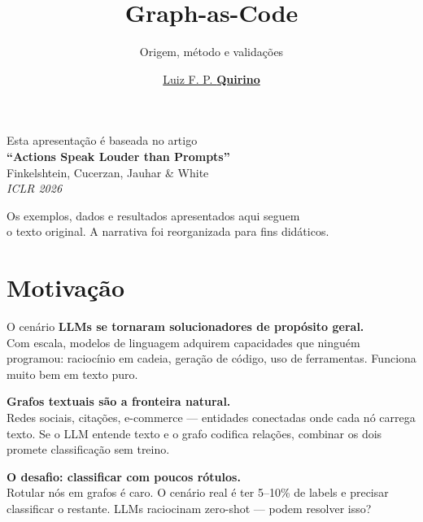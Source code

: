\documentclass{beamer}
\title{Graph-as-Code}
\subtitle{Origem, método e validações}
\author{\href{mailto:luiz.quirino@ufms.br}{Luiz F. P. \textbf{Quirino}}}
\begin{document}
\maketitle

\begin{frame}{}
  \vspace{2em}
  \begin{center}
    \large
    Esta apresentação é baseada no artigo\\[0.5em]
    \textbf{``Actions Speak Louder than Prompts''}\\[0.3em]
    \normalsize
    Finkelshtein, Cucerzan, Jauhar \& White\\[0.3em]
    \emph{ICLR 2026}
  \end{center}

  \vspace{1.5em}
  \begin{center}
    \normalsize
    Os exemplos, dados e resultados apresentados aqui seguem\\
    o texto original. A narrativa foi reorganizada para fins didáticos.
  \end{center}
\end{frame}


\section{Motivação}
\begin{frame}{O cenário}
  \textbf{LLMs se tornaram solucionadores de propósito geral.}\\
  {\small Com escala, modelos de linguagem adquirem capacidades que ninguém programou: raciocínio em cadeia, geração de código, uso de ferramentas. Funciona muito bem em texto puro.}

  \vspace{1em}
  \textbf{Grafos textuais são a fronteira natural.}\\
  {\small Redes sociais, citações, e-commerce --- entidades conectadas onde cada nó carrega texto. Se o LLM entende texto e o grafo codifica relações, combinar os dois promete classificação sem treino.}

  \vspace{1em}
  \textbf{O desafio: classificar com poucos rótulos.}\\
  {\small Rotular nós em grafos é caro. O cenário real é ter 5--10\% de labels e precisar classificar o restante. LLMs raciocinam zero-shot --- podem resolver isso?}
\end{frame}
\end{document}
